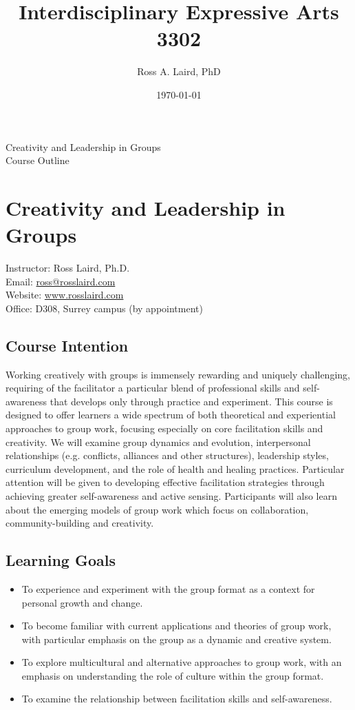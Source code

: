 \documentclass[letterpaper,10pt,headsepline]{scrreprt}
\author{Ross A. Laird, PhD}
\title{Interdisciplinary Expressive Arts 3302}
\date{\today}
\begin{document}
\pagestyle{empty}
\vspace*{7em} 
\begin{center}
\huge{Creativity and Leadership in Groups}\\
\vspace*{1em} 
\large{Course Outline}
\end{center}
\clearpage
\pagestyle{scrheadings}
\tableofcontents
\chapter{Creativity and Leadership in Groups}
Instructor: Ross Laird, Ph.D.\\ 
Email: \url{ross@rosslaird.com}\\
Website: \url{www.rosslaird.com}\\
Office: D308, Surrey campus (by appointment)\\

\section{Course Intention}
Working creatively with groups is immensely rewarding and uniquely challenging, requiring of the facilitator a particular blend of professional skills and self-awareness that develops only through practice and experiment. This course is designed to offer learners a wide spectrum of both theoretical and experiential approaches to group work, focusing especially on core facilitation skills and creativity. We will examine group dynamics and evolution, interpersonal relationships (e.g. conflicts, alliances and other structures), leadership styles, curriculum development, and the role of health and healing practices. Particular attention will be given to developing effective facilitation strategies through achieving greater self-awareness and active sensing. Participants will also learn about the emerging models of group work which focus on collaboration, community-building and creativity.

\section{Learning Goals}
\begin{itemize}
\item To experience and experiment with the group format as a context for personal growth and change.
\item To become familiar with current applications and theories of group work, with particular emphasis on the group as a dynamic and creative system.
\item To explore multicultural and alternative approaches to group work, with an emphasis on understanding the role of culture within the group format.
\item To examine the relationship between facilitation skills and self-awareness.   
\end{itemize}
\end{document}
